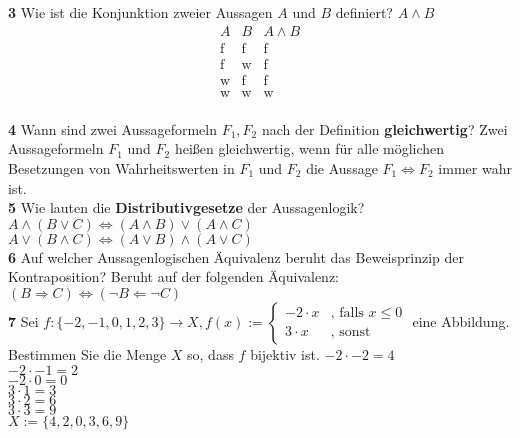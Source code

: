 \documentclass[11pt]{article}
\begin{document}
    \textbf{3} Wie ist die Konjunktion zweier Aussagen $A$ und $B$ definiert?\newline
    $A \land B$ 
    \[
        \begin{array}{c|c|c}
            A & B & A \land B \\
            \hline
            \text{f} & \text{f} & \text{f} \\
            \text{f} & \text{w} & \text{f} \\
            \text{w} & \text{f} & \text{f} \\
            \text{w} & \text{w} & \text{w} \\
        \end{array}
    \]\newline\newline


    \textbf{4} Wann sind zwei Aussageformeln $F_1, F_2$ nach der Definition \textbf{gleichwertig}?\newline
    Zwei Aussageformeln $F_1$ und $F_2$ heißen gleichwertig, wenn für alle möglichen Besetzungen von Wahrheitswerten in $F_1$ und $F_2$ die Aussage $F_1 \Leftrightarrow F_2$ immer wahr ist.\\

    \textbf{5} Wie lauten die \textbf{Distributivgesetze} der Aussagenlogik?\newline
    $A \land (B \lor C) \iff (A \land B) \lor (A \land C)$\\
    $A \lor (B \land C) \iff (A \lor B) \land (A \lor C)$\\


    \textbf{6} Auf welcher Aussagenlogischen Äquivalenz beruht das Beweisprinzip der Kontraposition?\newline
    Beruht auf der folgenden Äquivalenz:\\
    $(B \Rightarrow C) \Leftrightarrow (\neg B \Leftarrow \neg C)$\\

    \textbf{7} Sei $f : \{-2,-1,0,1,2,3\} \rightarrow X, f(x) :=  \begin{cases}
                                                                    -2 \cdot x & \text{, falls $x \leq 0$} \\
                                                                    3 \cdot x & \text{, sonst}
    \end{cases}$ eine Abbildung. Bestimmen Sie die Menge $X$ so, dass $f$ bijektiv ist.\newline
    $-2 \cdot -2 = 4$\\
    $-2 \cdot -1 = 2$\\
    $-2 \cdot 0 = 0$\\
    $3 \cdot 1 = 3$\\
    $3 \cdot 2 = 6$\\
    $3 \cdot 3 = 9$\\
    $X := \{4,2,0,3,6,9\}$\\
\end{document}
